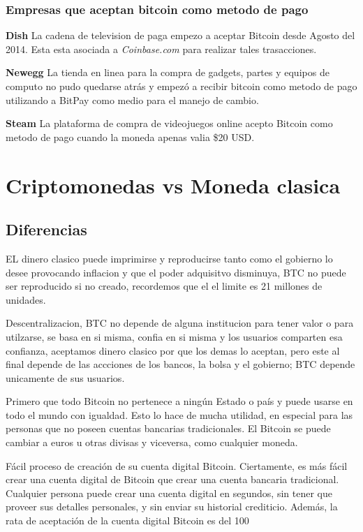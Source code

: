\documentclass[12pt,letterpaper]{article}
\begin{document}
            \subsubsection*{Empresas que aceptan bitcoin como metodo de pago}
\textbf{Dish}
La cadena de television de paga empezo a aceptar Bitcoin desde Agosto del 2014. Esta esta asociada a \textit{Coinbase.com} para realizar tales trasacciones.

\textbf{Newegg}
La tienda en linea para la compra de gadgets, partes y equipos de computo no pudo quedarse atr\'as y empez\'o a recibir bitcoin como metodo de pago utilizando a BitPay como medio para el manejo de cambio.

\textbf{Steam}
La plataforma de compra de videojuegos online acepto Bitcoin como metodo de pago cuando la moneda apenas valia \$20 USD.
\section*{Criptomonedas vs Moneda clasica}

	\subsection*{Diferencias}
	EL dinero clasico puede imprimirse y reproducirse tanto como el gobierno lo desee provocando inflacion y que el poder adquisitvo disminuya, BTC no puede ser reproducido si no creado, recordemos que el el limite es 21 millones de unidades.
	
	Descentralizacion, BTC no depende de alguna institucion para tener valor o para utilzarse, se basa en si misma, confia en si misma y los usuarios comparten esa confianza, aceptamos dinero clasico por que los demas lo aceptan, pero este al final depende de las accciones de los bancos, la bolsa y el gobierno; BTC depende unicamente de sus usuarios.
	
	Primero que todo Bitcoin no pertenece a ning\'un Estado o pa\'is y puede usarse en todo el mundo con igualdad. Esto lo hace de mucha utilidad, en especial para las personas que no poseen cuentas bancarias tradicionales. El Bitcoin se puede cambiar a euros u otras divisas y viceversa, como cualquier moneda. 
	
	F\'acil proceso de creaci\'on de su cuenta digital Bitcoin. Ciertamente, es m\'as f\'acil crear una cuenta digital de Bitcoin que crear una cuenta bancaria tradicional. Cualquier persona puede crear una cuenta digital en segundos, sin tener que proveer sus detalles personales, y sin enviar su historial crediticio. Adem\'as, la rata de aceptaci\'on de la cuenta digital Bitcoin es del 100%
	
\end{document}
